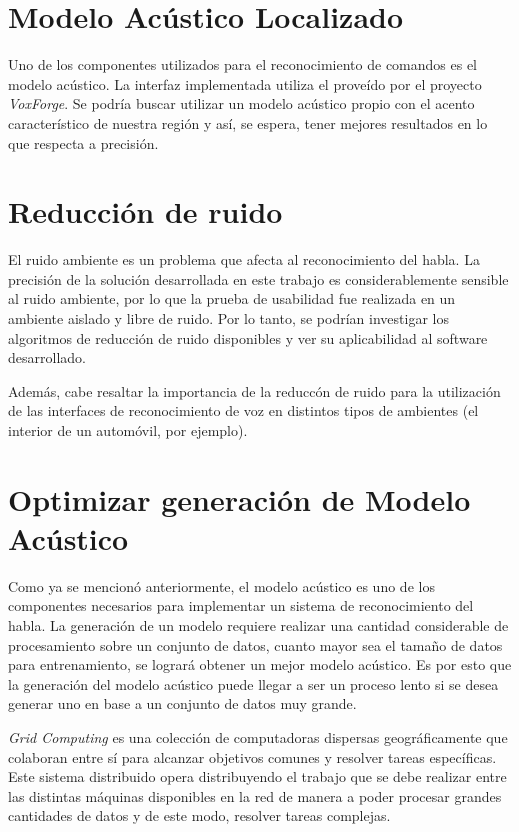 \section{Modelo Ac\'ustico Localizado}  

Uno de los componentes utilizados para el reconocimiento de comandos es el modelo ac\'ustico. La interfaz 
implementada utiliza el prove\'ido por el proyecto \emph{VoxForge}. Se podr\'ia buscar utilizar un 
modelo ac\'ustico propio con el acento caracter\'istico de nuestra regi\'on y as\'i, se espera, tener 
mejores resultados en lo que respecta a precisi\'on.

\section{Reducci\'on de ruido}

El ruido ambiente es un problema que afecta al reconocimiento del habla. La precisi\'on de la
soluci\'on desarrollada en este trabajo es considerablemente sensible al ruido ambiente, por lo que 
la prueba de usabilidad fue realizada en un ambiente aislado y libre de ruido. 
Por lo tanto, se podr\'ian investigar los algoritmos de reducci\'on de ruido disponibles y ver su aplicabilidad
al software desarrollado. 

Adem\'as, cabe resaltar la importancia de la reducc\'on de ruido para la utilizaci\'on de
las interfaces de reconocimiento de voz en distintos tipos de ambientes (el interior de un autom\'ovil, por ejemplo).

\section{Optimizar generaci\'on de Modelo Ac\'ustico}

Como ya se mencion\'o anteriormente, el modelo ac\'ustico es uno de los componentes necesarios para
implementar un sistema de reconocimiento del habla. La generación de un modelo requiere realizar una 
cantidad considerable de procesamiento sobre un conjunto de datos, cuanto mayor sea el tama\~no de datos 
para entrenamiento, se lograr\'a obtener un mejor modelo ac\'ustico. 
Es por esto que la generaci\'on del modelo ac\'ustico puede llegar a ser un proceso lento si se desea 
generar uno en base a un conjunto de datos muy grande.

\emph{Grid Computing} es una colecci\'on de computadoras dispersas geogr\'aficamente que colaboran entre 
sí para alcanzar objetivos comunes y resolver
tareas espec\'ificas. Este sistema distribuido opera distribuyendo el trabajo que se debe realizar entre 
las distintas m\'aquinas disponibles en la red
de manera a poder procesar grandes cantidades de datos y de este modo, resolver tareas complejas.

